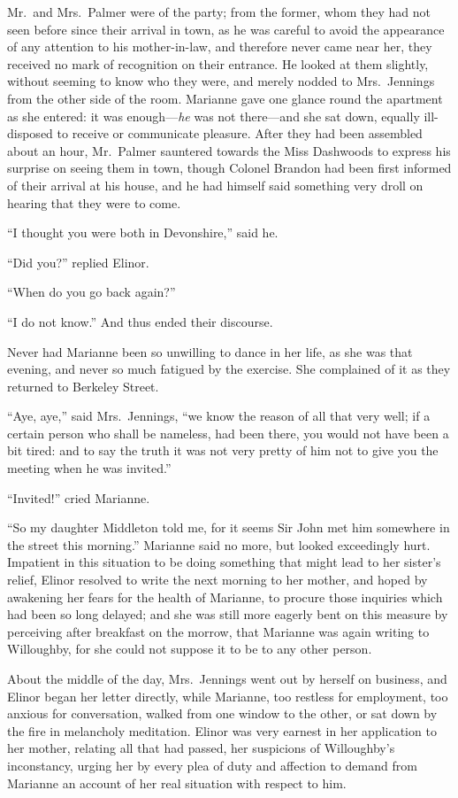 Mr.\ and Mrs.\ Palmer were of the party; from the former,
whom they had not seen before since their arrival in town,
as he was careful to avoid the appearance of any attention
to his mother-in-law, and therefore never came near her,
they received no mark of recognition on their entrance.
He looked at them slightly, without seeming to know
who they were, and merely nodded to Mrs.\ Jennings from
the other side of the room.  Marianne gave one glance
round the apartment as she entered: it was enough---\emph{he}
was not there---and she sat down, equally ill-disposed
to receive or communicate pleasure.  After they had been
assembled about an hour, Mr.\ Palmer sauntered towards
the Miss Dashwoods to express his surprise on seeing them
in town, though Colonel Brandon had been first informed
of their arrival at his house, and he had himself said
something very droll on hearing that they were to come.

``I thought you were both in Devonshire,'' said he.

``Did you?'' replied Elinor.

``When do you go back again?''

``I do not know.'' And thus ended their discourse.

Never had Marianne been so unwilling to dance
in her life, as she was that evening, and never so much
fatigued by the exercise.  She complained of it
as they returned to Berkeley Street.

``Aye, aye,'' said Mrs.\ Jennings, ``we know the reason
of all that very well; if a certain person who shall
be nameless, had been there, you would not have been a
bit tired: and to say the truth it was not very pretty
of him not to give you the meeting when he was invited.''

``Invited!'' cried Marianne.

``So my daughter Middleton told me, for it seems Sir
John met him somewhere in the street this morning.''
Marianne said no more, but looked exceedingly hurt.
Impatient in this situation to be doing something
that might lead to her sister's relief, Elinor resolved
to write the next morning to her mother, and hoped
by awakening her fears for the health of Marianne,
to procure those inquiries which had been so long delayed;
and she was still more eagerly bent on this measure
by perceiving after breakfast on the morrow, that Marianne
was again writing to Willoughby, for she could not suppose
it to be to any other person.

About the middle of the day, Mrs.\ Jennings went out by
herself on business, and Elinor began her letter directly,
while Marianne, too restless for employment, too anxious
for conversation, walked from one window to the other,
or sat down by the fire in melancholy meditation.
Elinor was very earnest in her application to her mother,
relating all that had passed, her suspicions of
Willoughby's inconstancy, urging her by every plea
of duty and affection to demand from Marianne an account
of her real situation with respect to him.

